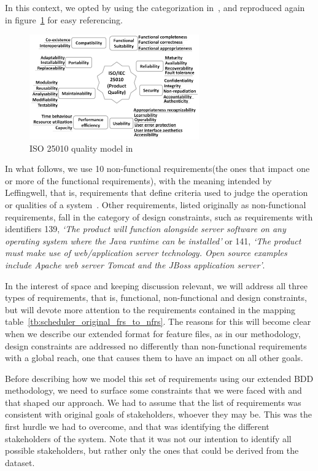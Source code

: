 \documentclass[dissertation,final]{softeng}
\newcommand{\nfrs}{non-functional requirements\xspace}
\begin{document}
In this context, we opted by using the categorization in~, and reproduced again in figure~\ref{fig:iso25010_again} for easy referencing.

\captionsetup[figure]{list=no}
\begin{figure}[h!]
\includegraphics[width=0.65\textwidth]{iso25010}
\centering
\caption[ISO 25010 quality model]{ISO 25010 quality model in ~}
\label{fig:iso25010_again}
\end{figure}
\captionsetup[figure]{list=yes}

In what follows, we use 10 \nfrs (the ones that impact one or more of the functional requirements), with the meaning intended by Leffingwell, that is, requirements that define criteria used to judge the operation or qualities of a system~\citep{Leffingwell2011}. Other requirements, listed originally as non-functional requirements, fall in the category of design constraints, such as requirements with identifiers 139, \emph{`The product will function alongside server software on any operating system where the Java runtime can be installed'} or 141, \emph{`The product must make use of web/application server technology. Open source examples include Apache web server Tomcat and the JBoss application server'}. 

In the interest of space and keeping discussion relevant, we will address all three types of requirements, that is, functional, non-functional and design constraints, but will devote more attention to the requirements contained in the mapping table~\ref{tb:scheduler_original_frs_to_nfrs}. The reasons for this will become clear when we describe our extended format for feature files, as in our methodology, design constraints are addressed no differently than non-functional requirements with a global reach, one that causes them to have an impact on all other goals.

Before describing how we model this set of requirements using our extended BDD methodology, we need to surface some constraints that we were faced with and that shaped our approach. We had to assume that the list of requirements was consistent with original goals of stakeholders, whoever they may be. This was the first hurdle we had to overcome, and that was identifying the different stakeholders of the system. Note that it was not our intention to identify all possible stakeholders, but rather only the ones that could be derived from the dataset.
\end{document}
